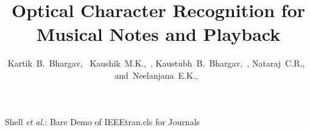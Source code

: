 \documentclass[journal]{IEEEtran}
\begin{document}
%
\title{Optical Character Recognition for Musical Notes and Playback }
%
%
%

\author{
        Kartik~B.~Bhargav,~
        Kaushik~M.K.,~,
        Kaustubh~B.~Bhargav,~,
        Nataraj~C.R.,~        
        and~Neelanjana~E.K.,~}%


% 
%



%
{Shell \MakeLowercase{\textit{et al.}}: Bare Demo of IEEEtran.cls for Journals}
% 
\end{document}
